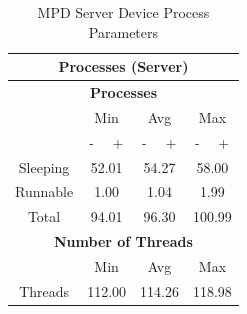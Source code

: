 \documentclass[11pt,a4paper,headinclude=false,footinclude=false]{scrreprt}
\begin{document}
\begin{table}[H]
\centering
    \begin{tabular}{||c|c|c|c|c|c|c||}
    \hline
    \multicolumn{7}{|c|}{\textbf{Processes (Server)}} \\
    \hline
    \multicolumn{7}{|c|}{\textbf{Processes}} \\
    \hline\hline
      & \multicolumn{2}{|c|}{Min} & \multicolumn{2}{|c|}{Avg} & \multicolumn{2}{|c|}{Max} \\
    \hline
      & - & + & - & + & - & + \\
    \hline
    Sleeping & \multicolumn{2}{|c|}{52.01} & \multicolumn{2}{|c|}{54.27} & \multicolumn{2}{|c|}{58.00} \\
    \hline
    Runnable & \multicolumn{2}{|c|}{1.00} & \multicolumn{2}{|c|}{1.04} & \multicolumn{2}{|c|}{1.99} \\
    \hline
    Total & \multicolumn{2}{|c|}{94.01} & \multicolumn{2}{|c|}{96.30} & \multicolumn{2}{|c|}{100.99} \\
    \hline\hline
    \multicolumn{7}{|c|}{\textbf{Number of Threads}} \\
    \hline\hline
      & \multicolumn{2}{|c|}{Min} & \multicolumn{2}{|c|}{Avg} & \multicolumn{2}{|c|}{Max} \\
    \hline
    Threads  & \multicolumn{2}{|c|}{112.00} & \multicolumn{2}{|c|}{114.26} & \multicolumn{2}{|c|}{118.98} \\
    \hline\hline
    \end{tabular}
    \caption{MPD Server Device Process Parameters}
    \label{MPDserverProcessTab}
\end{table}
\end{document}
